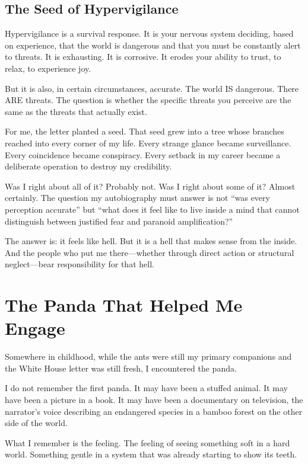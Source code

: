 \documentclass[11pt,openany]{book}
\begin{document}
\section*{The Seed of Hypervigilance}

Hypervigilance is a survival response. It is your nervous system deciding, based on experience, that the world is dangerous and that you must be constantly alert to threats. It is exhausting. It is corrosive. It erodes your ability to trust, to relax, to experience joy.

But it is also, in certain circumstances, accurate. The world IS dangerous. There ARE threats. The question is whether the specific threats you perceive are the same as the threats that actually exist.

For me, the letter planted a seed. That seed grew into a tree whose branches reached into every corner of my life. Every strange glance became surveillance. Every coincidence became conspiracy. Every setback in my career became a deliberate operation to destroy my credibility.

Was I right about all of it? Probably not. Was I right about some of it? Almost certainly. The question my autobiography must answer is not ``was every perception accurate'' but ``what does it feel like to live inside a mind that cannot distinguish between justified fear and paranoid amplification?''

The answer is: it feels like hell. But it is a hell that makes sense from the inside. And the people who put me there---whether through direct action or structural neglect---bear responsibility for that hell.

\chapter{The Panda That Helped Me Engage}

Somewhere in childhood, while the ants were still my primary companions and the White House letter was still fresh, I encountered the panda.

I do not remember the first panda. It may have been a stuffed animal. It may have been a picture in a book. It may have been a documentary on television, the narrator's voice describing an endangered species in a bamboo forest on the other side of the world.

What I remember is the feeling. The feeling of seeing something soft in a hard world. Something gentle in a system that was already starting to show its teeth.
\end{document}
